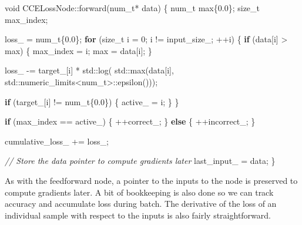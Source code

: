 \documentclass[
]{article}
\newenvironment{Shaded}{}{}
\newcommand{\BuiltInTok}[1]{#1}
\newcommand{\CommentTok}[1]{\textcolor[rgb]{0.38,0.63,0.69}{\textit{#1}}}
\newcommand{\ControlFlowTok}[1]{\textcolor[rgb]{0.00,0.44,0.13}{\textbf{#1}}}
\newcommand{\DataTypeTok}[1]{\textcolor[rgb]{0.56,0.13,0.00}{#1}}
\newcommand{\DecValTok}[1]{\textcolor[rgb]{0.25,0.63,0.44}{#1}}
\newcommand{\FloatTok}[1]{\textcolor[rgb]{0.25,0.63,0.44}{#1}}
\newcommand{\NormalTok}[1]{#1}
\newcommand{\VariableTok}[1]{\textcolor[rgb]{0.10,0.09,0.49}{#1}}
\begin{document}
\begin{Shaded}
\begin{Highlighting}[]
\DataTypeTok{void}\NormalTok{ CCELossNode::forward(}\DataTypeTok{num\_t}\NormalTok{* data)}
\NormalTok{\{}
    \DataTypeTok{num\_t}\NormalTok{ max\{}\FloatTok{0.0}\NormalTok{\};}
    \DataTypeTok{size\_t}\NormalTok{ max\_index;}

    \VariableTok{loss\_}\NormalTok{ = }\DataTypeTok{num\_t}\NormalTok{\{}\FloatTok{0.0}\NormalTok{\};}
    \ControlFlowTok{for}\NormalTok{ (}\DataTypeTok{size\_t}\NormalTok{ i = }\DecValTok{0}\NormalTok{; i != }\VariableTok{input\_size\_}\NormalTok{; ++i)}
\NormalTok{    \{}
        \ControlFlowTok{if}\NormalTok{ (data[i] \textgreater{} max)}
\NormalTok{        \{}
\NormalTok{            max\_index = i;}
\NormalTok{            max       = data[i];}
\NormalTok{        \}}

        \VariableTok{loss\_}\NormalTok{ {-}= }\VariableTok{target\_}\NormalTok{[i]}
\NormalTok{                 * }\BuiltInTok{std::}\NormalTok{log(}
                     \BuiltInTok{std::}\NormalTok{max(data[i], }\BuiltInTok{std::}\NormalTok{numeric\_limits\textless{}}\DataTypeTok{num\_t}\NormalTok{\textgreater{}::epsilon()));}

        \ControlFlowTok{if}\NormalTok{ (}\VariableTok{target\_}\NormalTok{[i] != }\DataTypeTok{num\_t}\NormalTok{\{}\FloatTok{0.0}\NormalTok{\})}
\NormalTok{        \{}
            \VariableTok{active\_}\NormalTok{ = i;}
\NormalTok{        \}}
\NormalTok{    \}}

    \ControlFlowTok{if}\NormalTok{ (max\_index == }\VariableTok{active\_}\NormalTok{)}
\NormalTok{    \{}
\NormalTok{        ++}\VariableTok{correct\_}\NormalTok{;}
\NormalTok{    \}}
    \ControlFlowTok{else}
\NormalTok{    \{}
\NormalTok{        ++}\VariableTok{incorrect\_}\NormalTok{;}
\NormalTok{    \}}

    \VariableTok{cumulative\_loss\_}\NormalTok{ += }\VariableTok{loss\_}\NormalTok{;}

    \CommentTok{// Store the data pointer to compute gradients later}
    \VariableTok{last\_input\_}\NormalTok{ = data;}
\NormalTok{\}}
\end{Highlighting}
\end{Shaded}

As with the feedforward node, a pointer to the inputs to the node is
preserved to compute gradients later. A bit of bookkeeping is also done
so we can track accuracy and accumulate loss during batch. The
derivative of the loss of an individual sample with respect to the
inputs is also fairly straightforward.
\end{document}
